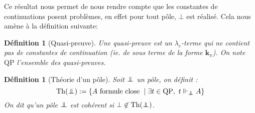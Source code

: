 \documentclass[a4paper,12pt]{article}
\newtheorem{defi}[theo]{Définition}
\theoremstyle{rmqstyle}
\newcommand{\set}[1]{\{#1\}}
\newcommand{\QP}{\mathrm{QP}}
\renewcommand{\k}{\mathbf{k}}
\newcommand{\pole}{{\protect\mathpalette{\protect\polehelper}{\bot}}} \def\polehelper#1#2{\mathrel{\rlap{$#1#2$}\mkern3mu{#1#2}}}
\newcommand{\Th}{\mathrm{Th}}
\begin{document}
Ce résultat nous permet de nous rendre compte que les constantes de continuations posent problèmes, en effet pour tout pôle, $\bot$ est réalisé. Cela nous amène à la définition suivante:

\begin{defi}[Quasi-preuve]
Une quasi-preuve est un $\lambda_c$-terme qui ne contient pas de constantes de continuation (ie. de sous terme de la forme $\k_\pi$). On note $\QP$ l'ensemble des quasi-preuves.
\end{defi}

\begin{defi}[Théorie d'un pôle]
Soit $\pole$ un pôle, on définit :
$$ \Th(\pole) := \set{ A \text{ formule close } \mid \exists t \in \QP, \ t \Vdash_\pole A }$$
On dit qu'un pôle $\pole$ est cohérent si $\bot \not \in \Th(\pole)$.
\end{defi}
\end{document}
